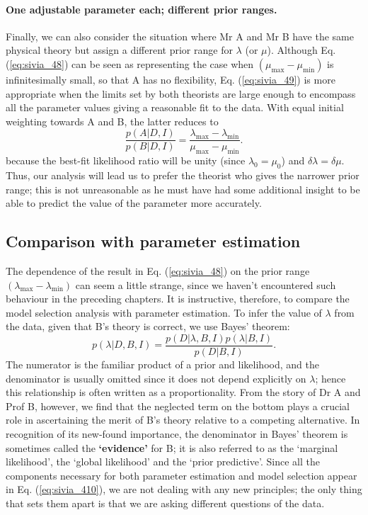 \documentclass[%
oneside,                 %
final,                   %
10pt]{article}
\begin{document}
\paragraph{One adjustable parameter each; different prior ranges.}
Finally, we can also consider the situation where Mr A and Mr B have the same physical theory but assign a different prior range for $\lambda$ (or $\mu$). Although Eq. (\ref{eq:sivia_48}) can be seen as representing the case when $(\mu_\mathrm{max} - \mu_\mathrm{min})$ is infinitesimally small, so that A has no flexibility, Eq. (\ref{eq:sivia_49}) is more appropriate when the limits set by both theorists are large enough to encompass all the parameter values giving a reasonable fit to the data. With equal initial weighting towards A and B, the latter reduces to
$$
\frac{p(A|D,I)}{p(B|D,I)} =  \frac{\lambda_\mathrm{max} - \lambda_\mathrm{min}}{\mu_\mathrm{max} - \mu_\mathrm{min}}. 
$$
because the best-fit likelihood ratio will be unity (since $\lambda_0 = \mu_0$) and $\delta\lambda = \delta\mu$. Thus, our analysis will lead us to prefer the theorist who gives the narrower prior range; this is not unreasonable as he must have had some additional insight to be able to predict the value of the parameter more accurately.

\subsection{Comparison with parameter estimation}
The dependence of the result in Eq. (\ref{eq:sivia_48}) on the prior range $(\lambda_\mathrm{max} - \lambda_\mathrm{min})$ can seem a little strange, since we haven’t encountered such behaviour in the preceding chapters. It is instructive, therefore, to compare the model selection analysis with parameter estimation. To infer the value of $\lambda$ from the data, given that B’s theory is correct, we use Bayes’ theorem:
\begin{equation}
p(\lambda|D,B,I) = \frac{p(D|\lambda,B,I) p(\lambda|B,I)}{p(D|B,I)}. 
\label{eq:sivia_410}
\end{equation}
The numerator is the familiar product of a prior and likelihood, and the denominator is usually omitted since it does not depend explicitly on $\lambda$; hence this relationship is often written as a proportionality. From the story of Dr A and Prof B, however, we find that the neglected term on the bottom plays a crucial role in ascertaining the merit of B’s theory relative to a competing alternative. In recognition of its new-found importance, the denominator in Bayes’ theorem is sometimes called the \textbf{‘evidence’} for B; it is also referred to as the ‘marginal likelihood’, the ‘global likelihood’ and the ‘prior predictive’. Since all the components necessary for both parameter estimation and model selection appear in Eq. (\ref{eq:sivia_410}), we are not dealing with any new principles; the only thing that sets them apart is that we are asking different questions of the data.
\end{document}
